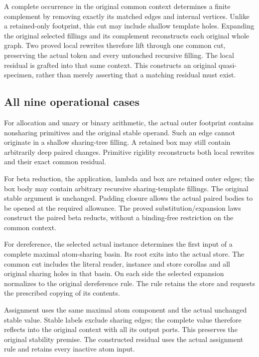 A complete occurrence in the original common context determines a finite
complement by removing exactly its matched edges and internal vertices.
Unlike a retained-only footprint, this cut may include shallow template
holes. Expanding the original selected fillings and its complement
reconstructs each original whole graph. Two proved local rewrites therefore
lift through one common cut, preserving the actual token and every untouched
recursive filling. The local residual is grafted into that same context.
This constructs an original quasi-specimen, rather than merely asserting
that a matching residual must exist.


\par{}

\subsection{All nine operational cases}
For allocation and unary or binary arithmetic, the actual outer footprint
contains nonsharing primitives and the original stable operand. Such an
edge cannot originate in a shallow sharing-tree filling. A retained box
may still contain arbitrarily deep paired changes. Primitive rigidity
reconstructs both local rewrites and their exact common residual.

For beta reduction, the application, lambda and box are retained outer
edges; the box body may contain arbitrary recursive sharing-template
fillings. The original stable argument is unchanged. Padding closure
allows the actual paired bodies to be opened at the required allowance.
The proved substitution/expansion laws construct the paired beta reducts,
without a binding-free restriction on the common context.

For dereference, the selected actual instance determines the first input
of a complete maximal atom-sharing basin. Its root exits into the actual
store. The common cut includes the literal reader, instance and store
corollas and all original sharing holes in that basin. On each side the
selected expansion normalizes to the original dereference rule. The rule
retains the store and requests the prescribed copying of its contents.

Assignment uses the same maximal atom component and the actual unchanged
stable value. Stable labels exclude sharing edges; the complete value
therefore reflects into the original context with all its output ports.
This preserves the original stability premise. The constructed residual
uses the actual assignment rule and retains every inactive atom input.

